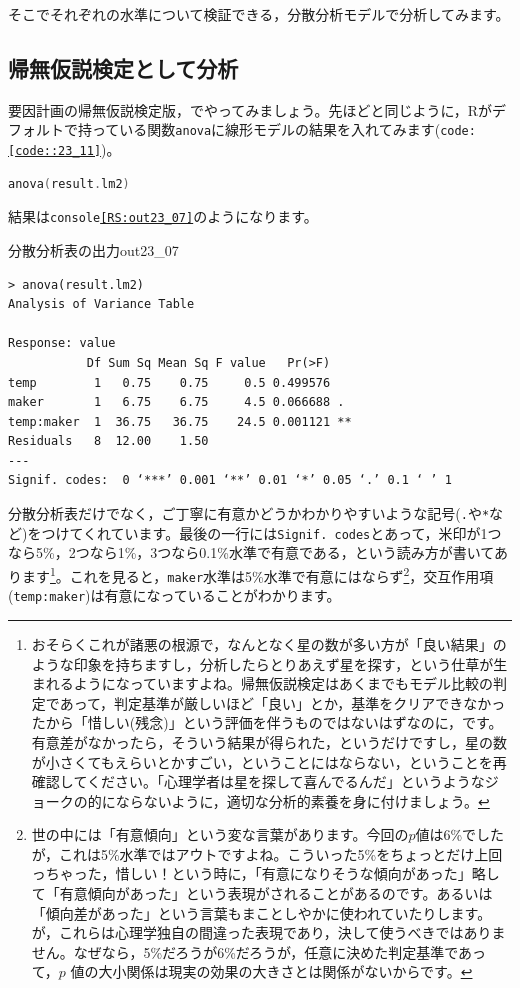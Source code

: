 \documentclass{ltjsarticle}
\begin{document}
そこでそれぞれの水準について検証できる，分散分析モデルで分析してみます。
\subsection{帰無仮説検定として分析}
要因計画の帰無仮説検定版，でやってみましょう。先ほどと同じように，Rがデフォルトで持っている関数\texttt{anova}に線形モデルの結果を入れてみます(\texttt{code:\ref{code::23_11}})。
\begin{lstlisting}[language=c++,label={code::23_11},caption={分散分析としてみる}]
anova(result.lm2)
\end{lstlisting}

結果は\texttt{console\ref{RS:out23_07}}のようになります。
\begin{Rscreen}{分散分析表の出力}{out23_07}
\begin{verbatim}
> anova(result.lm2)
Analysis of Variance Table

Response: value
           Df Sum Sq Mean Sq F value   Pr(>F)   
temp        1   0.75    0.75     0.5 0.499576   
maker       1   6.75    6.75     4.5 0.066688 . 
temp:maker  1  36.75   36.75    24.5 0.001121 **
Residuals   8  12.00    1.50                    
---
Signif. codes:  0 ‘***’ 0.001 ‘**’ 0.01 ‘*’ 0.05 ‘.’ 0.1 ‘ ’ 1
\end{verbatim}
\end{Rscreen}
分散分析表だけでなく，ご丁寧に有意かどうかわかりやすいような記号(\verb|.|や\verb|*|など)をつけてくれています。最後の一行には\texttt{Signif. codes}とあって，米印が1つなら5\%，2つなら1\%，3つなら0.1\%水準で有意である，という読み方が書いてあります\footnote{おそらくこれが諸悪の根源で，なんとなく星の数が多い方が「良い結果」のような印象を持ちますし，分析したらとりあえず星を探す，という仕草が生まれるようになっていますよね。帰無仮説検定はあくまでもモデル比較の判定であって，判定基準が厳しいほど「良い」とか，基準をクリアできなかったから「惜しい(残念)」という評価を伴うものではないはずなのに，です。有意差がなかったら，そういう結果が得られた，というだけですし，星の数が小さくてもえらいとかすごい，ということにはならない，ということを再確認してください。「心理学者は星を探して喜んでるんだ」というようなジョークの的にならないように，適切な分析的素養を身に付けましょう。}。これを見ると，\texttt{maker}水準は5\%水準で有意にはならず\footnote{世の中には「有意傾向」という変な言葉があります。今回の$p$値は6\%でしたが，これは5\%水準ではアウトですよね。こういった5\%をちょっとだけ上回っちゃった，惜しい！という時に，「有意になりそうな傾向があった」略して「有意傾向があった」という表現がされることがあるのです。あるいは「傾向差があった」という言葉もまことしやかに使われていたりします。が，これらは心理学独自の間違った表現であり，決して使うべきではありません。なぜなら，5\%だろうが6\%だろうが，任意に決めた判定基準であって，$p$ 値の大小関係は現実の効果の大きさとは関係がないからです。}，交互作用項(\texttt{temp:maker})は有意になっていることがわかります。
\end{document}
